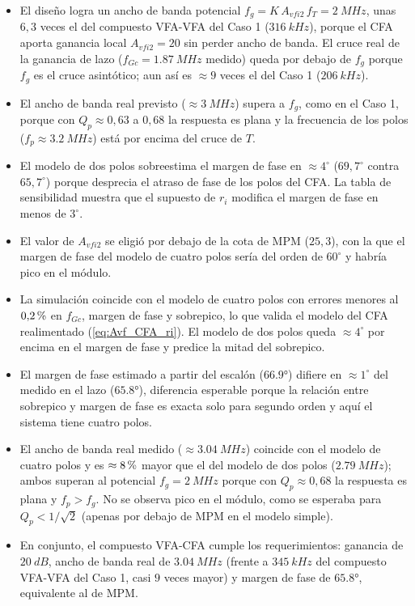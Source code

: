 \begin{itemize}
    \item El diseño logra un ancho de banda potencial $f_g = K\,A_{vfi2}\,f_T = \SI{2}{MHz}$, unas $6{,}3$ veces el del compuesto VFA-VFA del Caso 1 ($\SI{316}{kHz}$), porque el CFA aporta ganancia local $A_{vfi2}=20$ sin perder ancho de banda. El cruce real de la ganancia de lazo ($f_{Gc} = \SI{1,87}{MHz}$ medido) queda por debajo de $f_g$ porque $f_g$ es el cruce asintótico; aun así es $\approx9$ veces el del Caso 1 ($\SI{206}{kHz}$).
    \item El ancho de banda real previsto ($\approx\SI{3}{MHz}$) supera a $f_g$, como en el Caso 1, porque con $Q_p\approx0{,}63$ a $0{,}68$ la respuesta es plana y la frecuencia de los polos ($f_p\approx\SI{3,2}{MHz}$) está por encima del cruce de $T$.
    \item El modelo de dos polos sobreestima el margen de fase en $\approx4^\circ$ ($69{,}7^\circ$ contra $65{,}7^\circ$) porque desprecia el atraso de fase de los polos del CFA. La tabla de sensibilidad muestra que el supuesto de $r_i$ modifica el margen de fase en menos de $3^\circ$.
    \item El valor de $A_{vfi2}$ se eligió por debajo de la cota de MPM ($25{,}3$), con la que el margen de fase del modelo de cuatro polos sería del orden de $60^\circ$ y habría pico en el módulo.
    \item La simulación coincide con el modelo de cuatro polos con errores menores al $0{,}2\,\mathrm{\char37}$ en $f_{Gc}$, margen de fase y sobrepico, lo que valida el modelo del CFA realimentado (\autoref{eq:Avf_CFA_ri}). El modelo de dos polos queda $\approx 4^\circ$ por encima en el margen de fase y predice la mitad del sobrepico.
    \item El margen de fase estimado a partir del escalón ($\ang{66,9}$) difiere en $\approx1^\circ$ del medido en el lazo ($\ang{65,8}$), diferencia esperable porque la relación entre sobrepico y margen de fase es exacta solo para segundo orden y aquí el sistema tiene cuatro polos.
    \item El ancho de banda real medido ($\approx\SI{3,04}{MHz}$) coincide con el modelo de cuatro polos y es $\approx8\,\mathrm{\char37}$ mayor que el del modelo de dos polos ($\SI{2,79}{MHz}$); ambos superan al potencial $f_g = \SI{2}{MHz}$ porque con $Q_p\approx0{,}68$ la respuesta es plana y $f_p>f_g$. No se observa pico en el módulo, como se esperaba para $Q_p<1/\sqrt2$ (apenas por debajo de MPM en el modelo simple).
    \item En conjunto, el compuesto VFA-CFA cumple los requerimientos: ganancia de $\SI{20}{dB}$, ancho de banda real de $\SI{3,04}{MHz}$ (frente a $\SI{345}{kHz}$ del compuesto VFA-VFA del Caso 1, casi $9$ veces mayor) y margen de fase de $\ang{65,8}$, equivalente al de MPM.
\end{itemize}
